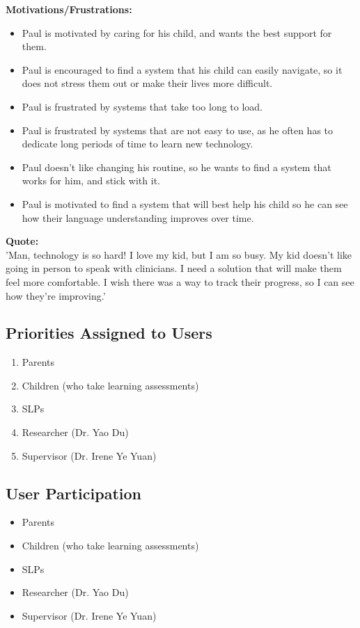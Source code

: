 \documentclass[12pt]{article}
\begin{document}
\textbf{Motivations/Frustrations:}
\begin{itemize}
  \item Paul is motivated by caring for his child, and wants the best support for them.
  \item Paul is encouraged to find a system that his child can easily navigate, so it does not stress them out or make their lives more difficult.
  \item Paul is frustrated by systems that take too long to load.
  \item Paul is frustrated by systems that are not easy to use, as he often has to dedicate long periods of time to learn new technology.
  \item Paul doesn't like changing his routine, so he wants to find a system that works for him, and stick with it.
  \item Paul is motivated to find a system that will best help his child so he can see how their language understanding improves over time.
\end{itemize}

\textbf{Quote:}\\
'Man, technology is so hard! I love my kid, but I am so busy. My kid doesn't like going in person to speak with clinicians. I need a solution that will make them feel more comfortable. I wish there was a way to track their progress, so I can see how they're improving.'\\

\subsection{Priorities Assigned to Users}
\begin{enumerate}
  \item Parents
  \item Children (who take learning assessments)
  \item SLPs
  \item Researcher (Dr. Yao Du)
  \item Supervisor (Dr. Irene Ye Yuan)
\end{enumerate}
\subsection{User Participation}
\begin{itemize}
  \item Parents
  \item Children (who take learning assessments)
  \item SLPs
  \item Researcher (Dr. Yao Du)
  \item Supervisor (Dr. Irene Ye Yuan)
\end{itemize}
\end{document}
